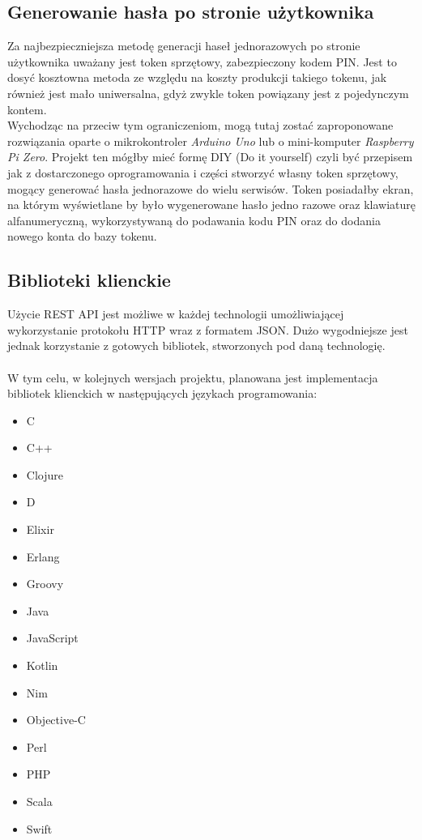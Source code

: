 \subsection{Generowanie hasła po stronie użytkownika}
Za najbezpieczniejsza metodę generacji haseł jednorazowych po stronie użytkownika uważany jest 
token sprzętowy, zabezpieczony kodem PIN. 
Jest to dosyć kosztowna metoda ze względu na koszty produkcji takiego tokenu, jak również 
jest mało uniwersalna, gdyż zwykle token powiązany jest z pojedynczym kontem. \\
Wychodząc na przeciw tym ograniczeniom, mogą tutaj zostać zaproponowane rozwiązania 
oparte o mikrokontroler \textit{Arduino Uno} lub o mini-komputer \textit{Raspberry Pi Zero}.
Projekt ten mógłby mieć formę DIY (Do it yourself) czyli być przepisem jak z dostarczonego 
oprogramowania i części stworzyć własny token sprzętowy, mogący generować hasła jednorazowe do wielu serwisów. 
Token posiadałby ekran, na którym wyświetlane by było wygenerowane hasło jedno razowe oraz klawiaturę 
alfanumeryczną, wykorzystywaną do podawania kodu PIN oraz do dodania nowego konta do bazy tokenu.

\subsection{Biblioteki klienckie}
Użycie REST API jest możliwe w każdej technologii umożliwiającej wykorzystanie protokołu HTTP 
wraz z formatem JSON. 
Dużo wygodniejsze jest jednak korzystanie z gotowych bibliotek, stworzonych pod daną technologię. \\ \\
W tym celu, w kolejnych wersjach projektu, planowana jest implementacja bibliotek klienckich w następujących 
językach programowania:
\begin{itemize}
	\item{C}
	\item{C++}
	\item{Clojure}
	\item{D}
	\item{Elixir}
	\item{Erlang}
	\item{Groovy}
	\item{Java}
	\item{JavaScript}
	\item{Kotlin}
	\item{Nim}
	\item{Objective-C}
	\item{Perl}
	\item{PHP}
	\item{Scala}
	\item{Swift}
\end{itemize}

